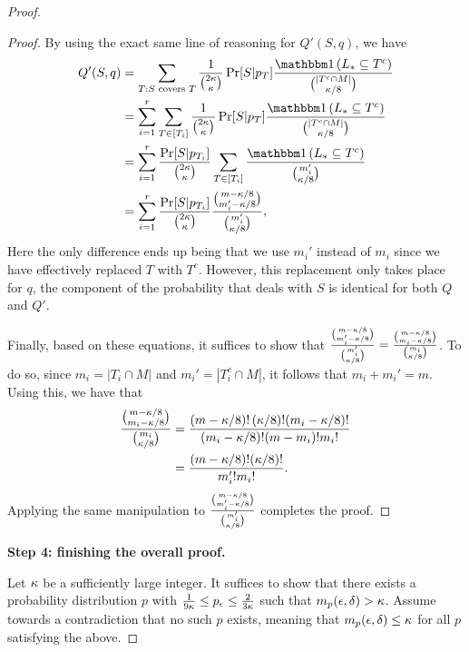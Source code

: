 \begin{proof}
\begin{proof}
By using the exact same line of reasoning for $Q'(S,q)$, we have 
\begin{equation*}
\begin{split}
Q'(S, q) &= \sum_{T: S\text{ covers }T} \frac{1}{\binom{2\a}{\a}}\Pr[S|p_T]\frac{\ind\left(L_* \subseteq T^c \right)}{\binom{|T^c \cap M|}{\a/8}} \\
&= \sum_{i = 1}^r \sum_{T \in [T_i]} \frac{1}{\binom{2\a}{\a}}\Pr[S|p_T]\frac{\ind\left(L_* \subseteq T^c\right)}{\binom{|T^c \cap M|}{\a/8}} \\
&= \sum_{i = 1}^r \frac{\Pr[S|p_{T_i}]}{\binom{2\a}{\a}}\sum_{T \in [T_i]} \frac{\ind\left(L_* \subseteq T^c\right)}{\binom{m_i'}{\a/8}}  \\
&= \sum_{i = 1}^r \frac{\Pr[S|p_{T_i}]}{\binom{2\a}{\a}}\frac{\binom{m - \a/8}{m_i' - \a/8}}{\binom{m_i'}{\a/8}},
\end{split}
\end{equation*}
Here the only difference ends up being that we use $m_i'$ instead of $m_i$ since we have effectively replaced $T$ with $T^c$. However, this replacement only takes place for $q$, the component of the probability that deals with $S$ is identical for both $Q$ and $Q'$. 

Finally, based on these equations, it suffices to show that $\frac{\binom{m - \kappa/8}{m_i' - \kappa/8}}{\binom{m_i'}{\kappa/8}} = \frac{\binom{m - \kappa/8}{m_i - \kappa/8}}{\binom{m_i}{\kappa/8}}$. To do so, since $m_i = |T_i \cap M|$ and $m_i' = |T_i^c \cap M|$, it follows that $m_i + m_i' = m$. Using this, we have that
\begin{equation*}
\begin{split}
\frac{\binom{m - \kappa/8}{m_i - \kappa/8}}{\binom{m_i}{\kappa/8}} &= \frac{\left(m - \kappa/8 \right)! \left(\kappa/8\right)!(m_i - \kappa/8)!}{(m_i  - \kappa/8)!(m - m_i)!m_i!} \\
&= \frac{(m - \kappa/8)!(\kappa/8)!}{m_i'!m_i!}.
\end{split}
\end{equation*}
Applying the same manipulation to $\frac{\binom{m - \kappa/8}{m_i' - \kappa/8}}{\binom{m_i'}{\kappa/8}}$ completes the proof.

\end{proof}

\textbf{Step 4: finishing the overall proof.}

Let $\kappa$ be a sufficiently large integer. It suffices to show that there exists a probability distribution $p$ with $\frac{1}{9\kappa} \leq p_\epsilon \leq \frac{2}{3\kappa}$ such that $m_p(\epsilon, \delta) > \kappa$. Assume towards a contradiction that no such $p$ exists, meaning that $m_p(\epsilon, \delta) \leq \kappa$ for all $p$ satisfying the above.  


\end{proof}
